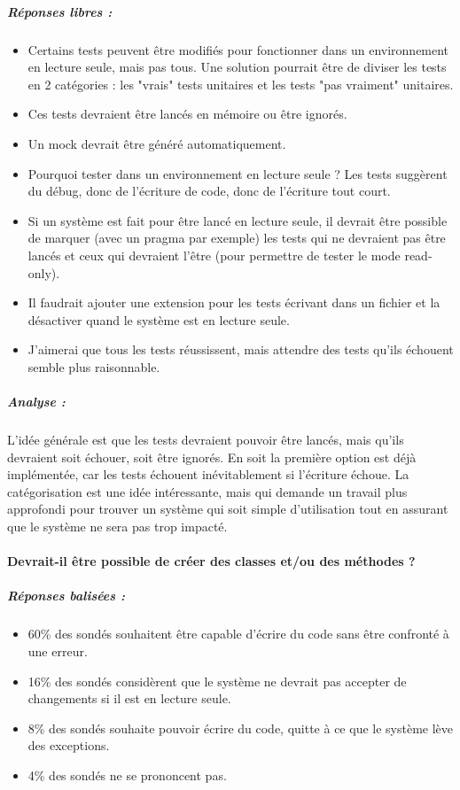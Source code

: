\subparagraph{Réponses libres :}
\begin{itemize}
	\item Certains tests peuvent être modifiés pour fonctionner dans un environnement en lecture seule, mais pas tous. Une solution pourrait être de diviser les tests en 2 catégories : les "vrais" tests unitaires et les tests "pas vraiment" unitaires.
	\item Ces tests devraient être lancés en mémoire ou être ignorés.
	\item Un mock devrait être généré automatiquement.
	\item Pourquoi tester dans un environnement en lecture seule ? Les tests suggèrent du débug, donc de l'écriture de code, donc de l'écriture tout court.
	\item Si un système est fait pour être lancé en lecture seule, il devrait être possible de marquer (avec un pragma par exemple) les tests qui ne devraient pas être lancés et ceux qui devraient l'être (pour permettre de tester le mode read-only).
	\item Il faudrait ajouter une extension pour les tests écrivant dans un fichier et la désactiver quand le système est en lecture seule.
	\item J'aimerai que tous les tests réussissent, mais attendre des tests qu'ils échouent semble plus raisonnable.
\end{itemize}

\subparagraph{Analyse :}
L'idée générale est que les tests devraient pouvoir être lancés, mais qu'ils devraient soit échouer, soit être ignorés. En soit la première option est déjà implémentée, car les tests échouent inévitablement si l'écriture échoue. La catégorisation est une idée intéressante, mais qui demande un travail plus approfondi pour trouver un système qui soit simple d'utilisation tout en assurant que le système ne sera pas trop impacté.

\paragraph{Devrait-il être possible de créer des classes et/ou des méthodes ?}
\subparagraph{Réponses balisées :}
\begin{itemize}
	\item 60\% des sondés souhaitent être capable d'écrire du code sans être confronté à une erreur.
	\item 16\% des sondés considèrent que le système ne devrait pas accepter de changements si il est en lecture seule.
	\item 8\% des sondés souhaite pouvoir écrire du code, quitte à ce que le système lève des exceptions.
	\item 4\% des sondés ne se prononcent pas.
\end{itemize}

